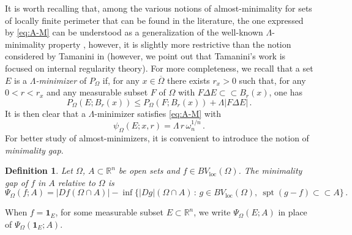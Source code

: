 \documentclass[a4paper,reqno,11pt]{amsart}
\newtheorem{definition}[theorem]{Definition}
\newcommand{\R}{\mathbb{R}}
\newcommand{\spt}{\mathop{\mathrm{spt}}}
\newcommand{\loc}{\mathop{\mathrm{loc}}}
\newcommand{\difsim}{\Delta}
\newcommand{\ch}{\mathbf{1}}
\renewcommand{\Subset}{\subset\!\subset}
\newcommand{\pr}{P_{\Omega}}
\begin{document}
It is worth recalling that, among the various notions of almost-minimality for sets of locally finite perimeter that can be found in the literature, the one expressed by \eqref{eq:A-M} can be understood as a generalization of the well-known $\Lambda$-minimality property \cite{Ambrosio_Introduttivo_00,maggi2012sets}, however, it is slightly more restrictive than the notion considered by Tamanini in \cite{Tamanini_quadLecce} (however, we point out that Tamanini's work is focused on internal regularity theory). For more completeness, we recall that a set $E$ is a \emph{$\Lambda$-minimizer} of $\pr$ if, for any $x \in \overline{\Omega}$ there exists $r_x > 0$ such that, for any $0 < r < r_x$ and any measurable subset $F$ of $\Omega$ with $F \difsim E \Subset B_r(x)$, one has
	\begin{equation*} %
		\pr(E;B_{r}(x)) \leq \pr(F;B_{r}(x)) + \Lambda |F \difsim E| \, .
	\end{equation*}
It is then clear that a $\Lambda$-minimizer satisfies \eqref{eq:A-M} with
	\begin{equation*}
		\psi_{\Omega}(E;x,r) = \Lambda \, r \, \omega_{n}^{1/n} \, .
	\end{equation*}
For better study of almost-minimizers, it is convenient to introduce the notion of \textit{minimality gap}. 	
	\begin{definition} \label{def:mingap}
		Let $\Omega$, $A \subset \R^{n}$ be open sets and $f \in BV_{\loc}(\Omega)$. The \emph{minimality gap} of $f$ in $A$ relative to $\Omega$ is
		\begin{equation*} %
			\Psi_{\Omega}(f;A) = |Df(\Omega \cap A)| - \inf\big\{ |Dg|(\Omega \cap A) \, : \, g \in BV_{\loc}(\Omega),\ \spt(g-f)\Subset A \big\} \, .
		\end{equation*}
	\end{definition}
When $f = \ch_{E}$, for some measurable subset $E \subset \R^{n}$, we write $\Psi_{\Omega}(E;A)$ in place of $\Psi_{\Omega}(\ch_{E};A)$.
	
	
\end{document}
